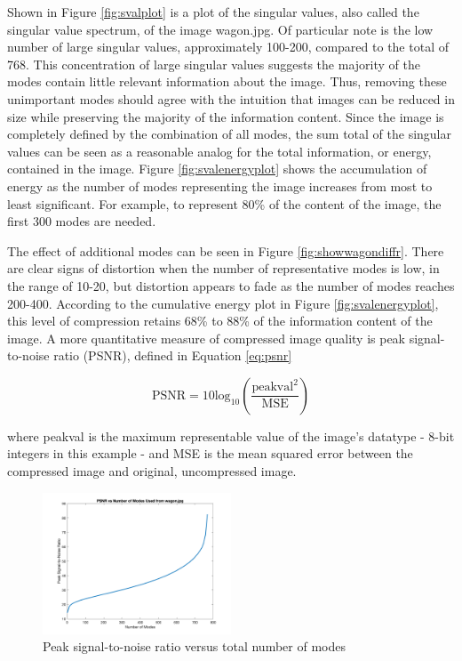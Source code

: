 \documentclass[conference]{IEEEtran}
\begin{document}
    Shown in Figure \ref{fig:svalplot} is a plot of the singular values, also called the singular value spectrum, of the image wagon.jpg. Of particular note is the low number of large singular values, approximately 100-200, compared to the total of 768. This concentration of large singular values suggests the majority of the modes contain little relevant information about the image. Thus, removing these unimportant modes should agree with the intuition that images can be reduced in size while preserving the majority of the information content. Since the image is completely defined by the combination of all modes, the sum total of the singular values can be seen as a reasonable analog for the total information, or energy, contained in the image. Figure \ref{fig:svalenergyplot} shows the accumulation of energy as the number of modes representing the image increases from most to least significant. For example, to represent 80\% of the content of the image, the first 300 modes are needed.

    The effect of additional modes can be seen in Figure \ref{fig:showwagondiffr}. There are clear signs of distortion when the number of representative modes is low, in the range of 10-20, but distortion appears to fade as the number of modes reaches 200-400. According to the cumulative energy plot in Figure \ref{fig:svalenergyplot}, this level of compression retains 68\% to 88\% of the information content of the image. A more quantitative measure of compressed image quality is peak signal-to-noise ratio (PSNR), defined in Equation \ref{eq:psnr}

    \begin{equation}
    		\text{PSNR} = 10\text{log}_{10}\left(\frac{\text{peakval}^2}{\text{MSE}}\right)
    \label{eq:psnr}
    \end{equation}

    where peakval is the maximum representable value of the image's datatype - 8-bit integers in this example - and MSE is the mean squared error between the compressed image and original, uncompressed image.

	\begin{figure}[t]
        \includegraphics[width=0.5\textwidth]{snrvsr_wagon_rgb}
        \caption{Peak signal-to-noise ratio versus total number of modes}
        \label{fig:psnrvsr_wagon}
    \end{figure}
    
\end{document}
